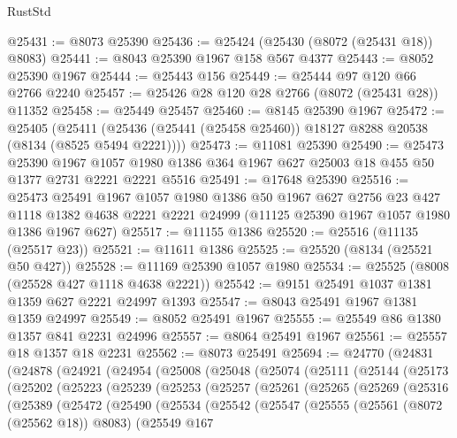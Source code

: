 \begin{lexlean}{RustStd}
\begin{coremodule}
{\begin{coremodule}
{{{{{{{{{{{{{{{{{{{{{{{{{{{{{{{{{{{{{{{{{{{{{{{{{{{{{@25431 := @8073 @25390
@25436 := @25424 (@25430 (@8072 (@25431 @18)) @8083)
@25441 := @8043 @25390 @1967 @158 @567 @4377
@25443 := @8052 @25390 @1967
@25444 := @25443 @156
@25449 := @25444 @97 @120 @66 @2766 @2240
@25457 := @25426 @28 @120 @28 @2766 (@8072 (@25431 @28)) @11352
@25458 := @25449 @25457
@25460 := @8145 @25390 @1967
@25472 := @25405
    (@25411 (@25436 (@25441 (@25458 @25460)) @18127 @8288 @20538 (@8134 (@8525 @5494 @2221))))
@25473 := @11081 @25390
@25490 := @25473
    @25390
    @1967
    @1057
    @1980
    @1386
    @364
    @1967
    @627
    @25003
    @18
    @455
    @50
    @1377
    @2731
    @2221
    @2221
    @5516
@25491 := @17648 @25390
@25516 := @25473
    @25491
    @1967
    @1057
    @1980
    @1386
    @50
    @1967
    @627
    @2756
    @23
    @427
    @1118
    @1382
    @4638
    @2221
    @2221
    @24999
    (@11125 @25390 @1967 @1057 @1980 @1386 @1967 @627)
@25517 := @11155 @1386
@25520 := @25516 (@11135 (@25517 @23))
@25521 := @11611 @1386
@25525 := @25520 (@8134 (@25521 @50 @427))
@25528 := @11169 @25390 @1057 @1980
@25534 := @25525 (@8008 (@25528 @427 @1118 @4638 @2221))
@25542 := @9151 @25491 @1037 @1381 @1359 @627 @2221 @24997 @1393
@25547 := @8043 @25491 @1967 @1381 @1359 @24997
@25549 := @8052 @25491 @1967
@25555 := @25549 @86 @1380 @1357 @841 @2231 @24996
@25557 := @8064 @25491 @1967
@25561 := @25557 @18 @1357 @18 @2231
@25562 := @8073 @25491
@25694 := @24770
    (@24831
      (@24878
        (@24921
          (@24954
            (@25008
              (@25048
                (@25074
                  (@25111
                    (@25144
                      (@25173
                        (@25202
                          (@25223
                            (@25239
                              (@25253
                                (@25257
                                  (@25261
                                    (@25265
                                      (@25269
                                        (@25316
                                          (@25389
                                            (@25472
                                              (@25490
                                                (@25534
                                                  (@25542
                                                    (@25547
                                                      (@25555
                                                        (@25561 (@8072 (@25562 @18)) @8083)
                                                        (@25549
                                                          @167
}}}}}}}}}}}}}}}}}}}}}}}}}}}}}}}}}}}}}}}}}}}}}}}}}}}}}
\end{coremodule}}
\end{coremodule}
\end{lexlean}
